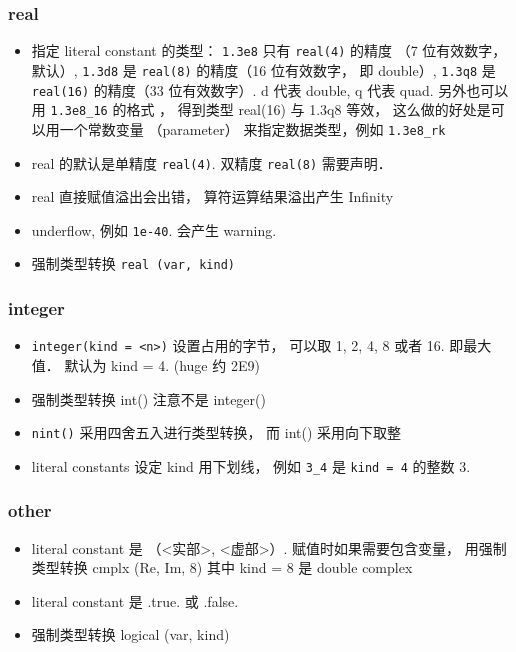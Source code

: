 \subsubsection{real}
\begin{itemize}
\item 指定 literal constant 的类型： \verb|1.3e8| 只有 \verb|real(4)| 的精度 （7 位有效数字， 默认）, \verb|1.3d8| 是 \verb|real(8)| 的精度（16 位有效数字， 即 double）, \verb|1.3q8| 是 \verb|real(16)| 的精度（33 位有效数字）. d 代表 double, q 代表 quad. 另外也可以用 \verb|1.3e8_16| 的格式 ， 得到类型  real(16) 与 1.3q8 等效， 这么做的好处是可以用一个常数变量 （parameter） 来指定数据类型，例如 \verb|1.3e8_rk|
\item real 的默认是单精度 \verb|real(4)|. 双精度 \verb|real(8)| 需要声明．
\item real 直接赋值溢出会出错， 算符运算结果溢出产生 Infinity
\item underflow, 例如 \verb|1e-40|. 会产生 warning.
\item 强制类型转换 \verb|real (var, kind)|
\end{itemize}

\subsubsection{integer}
\begin{itemize}
\item \verb`integer(kind = <n>)` 设置占用的字节， 可以取 1, 2, 4, 8 或者 16. 即最大值． 默认为 
   kind = 4. (huge 约 2E9)
\item 强制类型转换 int() 注意不是 integer()
\item \verb`nint()` 采用四舍五入进行类型转换， 而 int() 采用向下取整
\item literal constants 设定 kind 用下划线， 例如 \verb`3_4` 是 \verb`kind = 4` 的整数 3.
\end{itemize}

\subsubsection{other}
\begin{itemize}
\item literal constant 是 （<实部>, <虚部>）. 赋值时如果需要包含变量， 用强制类型转换 cmplx (Re, Im, 8) 其中 kind = 8 是 double complex
\item literal constant 是 .true. 或 .false.
\item 强制类型转换 logical (var, kind)
\end{itemize}

